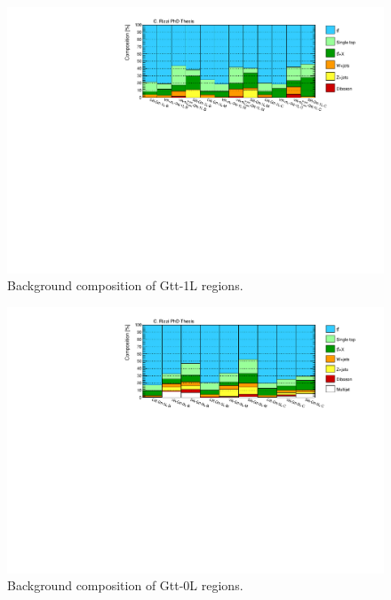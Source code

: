 \begin{figure}[htbp]
\includegraphics[width=\textwidth]{figures/strong_prod/comp_plots/Gtt_1L_bkg.pdf}
\caption{Background composition of Gtt-1L regions.}
	\label{fig:bkgcomp_Gtt1L}
\end{figure}

\begin{figure}[htbp]
\includegraphics[width=\textwidth]{figures/strong_prod/comp_plots/Gtt_0L_bkg.pdf}
\caption{Background composition of Gtt-0L regions.}
	\label{fig:bkgcomp_Gtt0L}
\end{figure}

